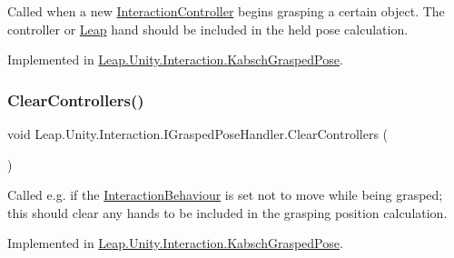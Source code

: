 Called when a new \mbox{\hyperlink{class_leap_1_1_unity_1_1_interaction_1_1_interaction_controller}{Interaction\+Controller}} begins grasping a certain object. The controller or \mbox{\hyperlink{namespace_leap_1_1_unity_1_1_leap}{Leap}} hand should be included in the held pose calculation. 



Implemented in \mbox{\hyperlink{class_leap_1_1_unity_1_1_interaction_1_1_kabsch_grasped_pose_a48e190a6d9cadcaf3340d339ac61d464}{Leap.\+Unity.\+Interaction.\+Kabsch\+Grasped\+Pose}}.

\mbox{\label{interface_leap_1_1_unity_1_1_interaction_1_1_i_grasped_pose_handler_a1f78ffa53ab585a1b283548e4e4381c8}} 
\subsubsection{\texorpdfstring{ClearControllers()}{ClearControllers()}}
{\footnotesize\ttfamily void Leap.\+Unity.\+Interaction.\+I\+Grasped\+Pose\+Handler.\+Clear\+Controllers (\begin{DoxyParamCaption}{ }\end{DoxyParamCaption})}



Called e.\+g. if the \mbox{\hyperlink{class_leap_1_1_unity_1_1_interaction_1_1_interaction_behaviour}{Interaction\+Behaviour}} is set not to move while being grasped; this should clear any hands to be included in the grasping position calculation. 



Implemented in \mbox{\hyperlink{class_leap_1_1_unity_1_1_interaction_1_1_kabsch_grasped_pose_a016fe0af189b4caae24050a70b4d2462}{Leap.\+Unity.\+Interaction.\+Kabsch\+Grasped\+Pose}}.

\mbox{\label{interface_leap_1_1_unity_1_1_interaction_1_1_i_grasped_pose_handler_a5721a16b0e8e2f8715edfad605931638}} 
